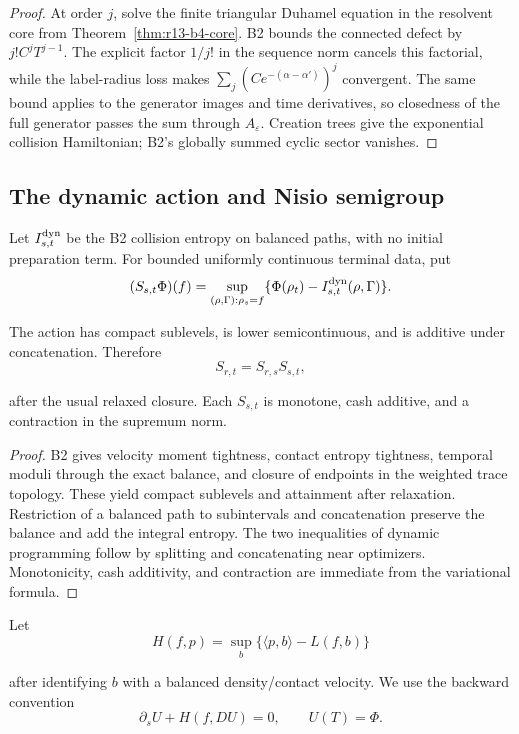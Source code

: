 \begin{proof}
At order $j$, solve the finite triangular Duhamel equation in the resolvent
core from Theorem~\ref{thm:r13-b4-core}.  B2 bounds the connected defect by
$j!C^jT^{j-1}$.  The explicit factor $1/j!$ in the sequence norm cancels this
factorial, while the label-radius loss makes
$\sum_j(Ce^{-(\alpha-\alpha')})^j$ convergent.  The same bound applies to the
generator images and time derivatives, so closedness of the full generator
passes the sum through $A_\varepsilon$.  Creation trees give the exponential
collision Hamiltonian; B2's globally summed cyclic sector vanishes.
\end{proof}

\subsection{The dynamic action and Nisio semigroup}

Let $I_{s,t}^{\rm dyn}$ be the B2 collision entropy on balanced paths, with no
initial preparation term.  For bounded uniformly continuous terminal data,
put
\[
 (S_{s,t}\Phi)(f)
 =\sup_{(\rho,\Gamma):\rho_s=f}
 \{\Phi(\rho_t)-I_{s,t}^{\rm dyn}(\rho,\Gamma)\}.
\]

\begin{theorem}
\label{thm:r13-b4-action}
The action has compact sublevels, is lower semicontinuous, and is additive
under concatenation.  Therefore
\[
 S_{r,t}=S_{r,s}S_{s,t},
\]

after the usual relaxed closure.  Each $S_{s,t}$ is monotone, cash additive,
and a contraction in the supremum norm.
\end{theorem}

\begin{proof}
B2 gives velocity moment tightness, contact entropy tightness, temporal
moduli through the exact balance, and closure of endpoints in the weighted
trace topology.  These yield compact sublevels and attainment after
relaxation.  Restriction of a balanced path to subintervals and concatenation
preserve the balance and add the integral entropy.  The two inequalities of
dynamic programming follow by splitting and concatenating near optimizers.
Monotonicity, cash additivity, and contraction are immediate from the
variational formula.
\end{proof}

Let
\[
 H(f,p)=\sup_{b}\{\langle p,b\rangle-L(f,b)\}
\]

after identifying $b$ with a balanced density/contact velocity.  We use the
backward convention
\[
 \partial_sU+H(f,DU)=0,
 \qquad U(T)=\Phi.
\]

